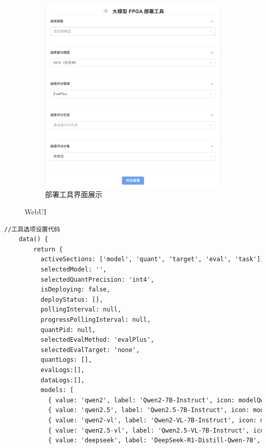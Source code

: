 \documentclass[AutoFakeBold,AutoFakeSlant,language=chinese,degree=bachelor]{sustechthesis}
\begin{document}
\begin{itemize}
\begin{figure}[htb]
\begin{subfigure}[t]{.2\textwidth}
                \centering
                \includegraphics[width=\textwidth]{./figures/deploymenttool_display.png}
                \caption{部署工具界面展示}
            \end{subfigure}
            \caption{WebUI}
        \end{figure}
        \begin{lstlisting}[language=HTML]
    //工具选项设置代码
    data() {
        return {
          activeSections: ['model', 'quant', 'target', 'eval', 'task'],
          selectedModel: '',
          selectedQuantPrecision: 'int4',
          isDeploying: false,
          deployStatus: [],
          pollingInterval: null,
          progressPollingInterval: null,
          quantPid: null,
          selectedEvalMethod: 'evalPlus',
          selectedEvalTarget: 'none',
          quantLogs: [],
          evalLogs:[],
          dataLogs:[],
          models: [
            { value: 'qwen2', label: 'Qwen2-7B-Instruct', icon: modelQwen },
            { value: 'qwen2.5', label: 'Qwen2.5-7B-Instruct', icon: modelQwen },
            { value: 'qwen2-vl', label: 'Qwen2-VL-7B-Instruct', icon: modelQwen },
            { value: 'qwen2.5-vl', label: 'Qwen2.5-VL-7B-Instruct', icon: modelQwen },
            { value: 'deepseek', label: 'DeepSeek-R1-Distill-Qwen-7B', icon: modelDeepseek }

\end{lstlisting}
\end{itemize}
\end{document}
